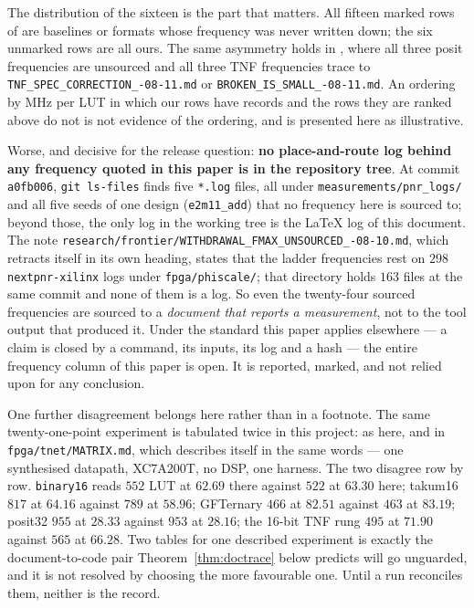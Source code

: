 The distribution of the sixteen is the part that matters. All fifteen marked rows
of  are baselines or formats whose frequency was
never written down; the six unmarked rows are all ours. The same asymmetry holds in
, where all three posit frequencies are unsourced and all three
TNF frequencies trace to
\texttt{TNF\_\allowbreak SPEC\_\allowbreak CORRECTION\_-08-11.md} or
\texttt{BROKEN\_\allowbreak IS\_\allowbreak SMALL\_-08-11.md}. An ordering by MHz per LUT in which our
rows have records and the rows they are ranked above do not is not evidence of the
ordering, and is presented here as illustrative.

Worse, and decisive for the release question: \textbf{no place-and-route log behind
any frequency quoted in this paper is in the repository tree}. At commit \texttt{a0fb006}, \texttt{git ls-files} finds five \texttt{*.log} files, all under \texttt{measurements/pnr\_logs/} and all five seeds of one design (\texttt{e2m11\_add}) that no frequency here is sourced to; beyond those, the only log in the working tree is the \LaTeX{} log of this document. The note \texttt{research/\allowbreak frontier/\allowbreak WITHDRAWAL\_\allowbreak FMAX\_\allowbreak UNSOURCED\_-08-10.md}, which retracts itself in its own heading, states that the ladder frequencies
rest on $298$ \texttt{nextpnr-xilinx} logs under \texttt{fpga/phiscale/}; that
directory holds $163$ files at the same commit and none of them is a log. So even the twenty-four
sourced frequencies are sourced to a \emph{document that reports a measurement},
not to the tool output that produced it. Under the standard this paper applies
elsewhere --- a claim is closed by a command, its inputs, its log and a hash --- the
entire frequency column of this paper is open. It is reported, marked, and not
relied upon for any conclusion.

One further disagreement belongs here rather than in a footnote. The same
twenty-one-point experiment is tabulated twice in this project: as
 here, and in \texttt{fpga/tnet/MATRIX.md}, which
describes itself in the same words --- one synthesised datapath, XC7A200T, no DSP,
one harness. The two disagree row by row. \texttt{binary16} reads $552$ LUT at
$62.69$ there against $522$ at $63.30$ here; takum16 $817$ at $64.16$ against $789$
at $58.96$; GFTernary $466$ at $82.51$ against $463$ at $83.19$; posit32 $955$ at
$28.33$ against $953$ at $28.16$; the 16-bit TNF rung $495$ at $71.90$ against $565$
at $66.28$. Two tables for one described experiment is exactly the document-to-code
pair Theorem~\ref{thm:doctrace} below predicts will go unguarded, and it is not
resolved by choosing the more favourable one. Until a run reconciles them, neither
is the record.

